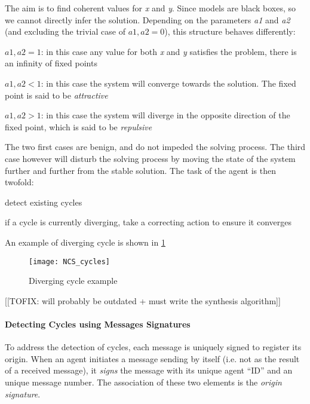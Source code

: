 The aim is to find coherent values for \emph{x} and \emph{y}. Since models are black boxes, so we cannot directly infer the solution. Depending on the parameters \emph{a1} and \emph{a2} (and excluding the trivial case of \(a1, a2 = 0\)), this structure behaves differently: 
 
\begin{compactitem}
\item \(a1, a2 = 1\): in this case any value for both \emph{x} and \emph{y} satisfies the problem, there is an infinity of fixed points
\item \(a1, a2 < 1\): in this case the system will converge towards the solution. The fixed point is said to be \emph{attractive}
\item \(a1, a2 > 1\): in this case the system will diverge in the opposite direction of the fixed point, which is said to be \emph{repulsive}
\end{compactitem}

The two first cases are benign, and do not impeded the solving process. The third case however will disturb the solving process by moving the state of the system further and further from the stable solution. The task of the agent is then twofold:
\begin{compactenum}
\item detect existing cycles
\item if a cycle is currently diverging, take a correcting action to ensure it converges
\end{compactenum}

An example of diverging cycle is shown in \figurename{} \ref{NCS_cycles_fig}

\begin{figure}
\centering
\texttt{[image: NCS\_cycles]}
\caption{Diverging cycle example}\label{NCS_cycles_fig}
\end{figure}

[[TOFIX: will probably be outdated + must write the synthesis algorithm]]
\paragraph*{Detecting Cycles using Messages Signatures}
To address the detection of cycles, each message is uniquely signed to register its origin. When an agent initiates a message sending by itself (i.e. not as the result of a received message), it \emph{signs} the message with its unique agent \enquote{ID} and an unique message number. The association of these two elements is the \emph{origin signature}.

